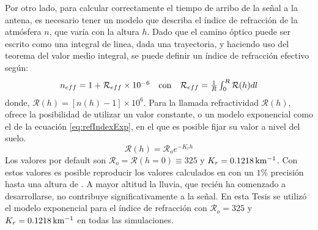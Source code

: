 		Por otro lado, para calcular correctamente el tiempo de arribo de la se\~nal a la antena, es necesario tener un modelo que describa el \'indice de refracci\'on de la atm\'osfera $n$, que var\'ia con la altura $h$.
		Dado que el camino \'optico puede ser escrito como una integral de linea, dada una trayectoria, y haciendo uso del teorema del valor medio integral, se puede definir un \'indice de refracci\'on efectivo seg\'un:
		\begin{equation}
			\begin{matrix}
			n_{eff}
			=
			1+{\mathcal R}_{eff}\times10^{-6}
			&
			{\rm con}
			&
			{\mathcal R}_{eff}
			=
			\frac{1}{R}\int_0^R{\mathcal R}(h)dl
			\end{matrix}
		\label{eq:refIndexEff}
		\end{equation}
		donde, ${\mathcal R}(h) = \left[ n(h)-1 \right] \times 10^6$.
		Para la llamada refractividad ${\mathcal R}(h)$, \zhs{} ofrece la posibilidad de utilizar un valor constante, o un modelo exponencial como el de la ecuaci\'on \ref{eq:refIndexExp}, en el que es posible fijar su valor a nivel del suelo.
		\begin{equation}
		{\mathcal R}(h)
		=
		{\mathcal R}_o
		e^{-K_rh}
		\label{eq:refIndexExp}
		\end{equation}
		Los valores por default son ${\mathcal R}_o={\mathcal R}(h=0)\equiv 325$ y $K_r=0.1218{\rm\, km^{-1}}$.
		Con estos valores es posible reproducir los valores calculados en \cite{gerson1948polar} con un $1\%$ precisi\'on hasta una altura de .
		A mayor altitud la lluvia, que reci\'en ha comenzado a desarrollarse, no contribuye significativamente a la se\~nal.
		En esta Tesis se utiliz\'o el modelo exponencial para el \'indice de refracci\'on con ${\mathcal R}_o=325$ y $K_r=0.1218{\rm\, km^{-1}}$ en todas las simulaciones.
		

